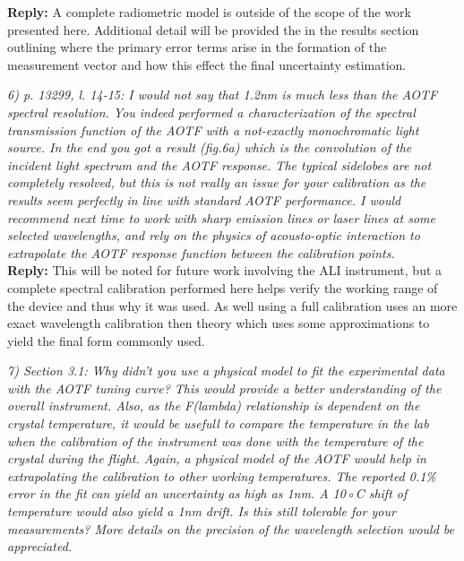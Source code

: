 \documentclass[12pt, notitlepage]{article}
\begin{document}
\textbf{Reply:} A complete radiometric model is outside of the scope of the work presented here. Additional detail will be provided the in the results section outlining where the primary error terms arise in the formation of the measurement vector and how this effect the final uncertainty estimation.

\hrulefill

\textit{6) p. 13299, l. 14-15: I would not say that 1.2nm is much less than the AOTF spectral
resolution. You indeed performed a characterization of the spectral transmission
function of the AOTF with a not-exactly monochromatic light source. In the end you got
a result (fig.6a) which is the convolution of the incident light spectrum and the AOTF
response. The typical sidelobes are not completely resolved, but this is not really an
issue for your calibration as the results seem perfectly in line with standard AOTF performance.
I would recommend next time to work with sharp emission lines or laser lines
at some selected wavelengths, and rely on the physics of acousto-optic interaction to
extrapolate the AOTF response function between the calibration points.}\\

\textbf{Reply:} This will be noted for future work involving the ALI instrument, but a complete spectral calibration performed here helps verify the working range of the device and thus why it was used. As well using a full calibration uses an more exact wavelength calibration then theory which uses some approximations to yield the final form commonly used.

\hrulefill

\textit{7) Section 3.1: Why didn’t you use a physical model to fit the experimental data with
the AOTF tuning curve? This would provide a better understanding of the overall instrument.
Also, as the F(lambda) relationship is dependent on the crystal temperature,
it would be usefull to compare the temperature in the lab when the calibration of the
instrument was done with the temperature of the crystal during the flight. Again, a
physical model of the AOTF would help in extrapolating the calibration to other working
temperatures. The reported 0.1\% error in the fit can yield an uncertainty as high as
1nm. A 10◦C shift of temperature would also yield a 1nm drift. Is this still tolerable for
your measurements? More details on the precision of the wavelength selection would
be appreciated.}\\
\end{document}
